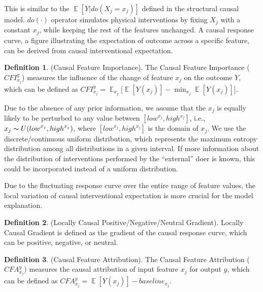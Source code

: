 \documentclass[letterpaper]{article} %
\DeclareMathOperator{\E}{\mathbb{E}}
\theoremstyle{definition}
\newtheorem{definition}{Definition}
\theoremstyle{remark}
\begin{document}
This is similar to the $\E[Y|do(X_j=x_j)]$ defined in the structural causal model. $do(\cdot)$ operator simulates physical interventions by fixing $X_j$ with a constant $x_j$, while keeping the rest of the features unchanged. A causal response curve, a figure illustrating the expectation of outcome across a specific feature, can be derived from causal interventional expectation.



\theoremstyle{definition}
\begin{definition}({Causal Feature Importance}).
The Causal Feature Importance ($CFI^y_{x_j}$) measures the influence of the change of feature $x_j$ on the outcome $Y$, which can be defined as $CFI^y_{x_j} = \E_{x_j} \Bigr[ \E [Y(x_j)] - \min_{x_j} \E[Y(x_j)] \Bigr] $.
\label{def: causal importance}
\end{definition}

Due to the absence of any prior information, we assume that the $x_j$ is equally likely to be perturbed to any value between $[{low}^{x_j}, {high}^{x_j}]$, i.e., $x_j \thicksim U({low}^{x_j}, {high}^{x_j})$, where $[{low}^{x_j}, {high}^{x_j}]$ is the domain of $x_j $. We use the discrete/continuous uniform distribution, which represents the maximum entropy distribution among all distributions in a given interval. If more information about the distribution of interventions performed by the “external” doer is known, this could be incorporated instead of a uniform distribution.

Due to the fluctuating response curve over the entire range of feature values, the local variation of causal interventional expectation is more crucial for the model explanation. 

\theoremstyle{definition}
\begin{definition}({Locally Causal Positive/Negative/Neutral Gradient}). Locally Causal Gradient is defined as the gradient of the causal response curve, which can be positive, negative, or neutral. 
\label{def: causal attribution}
\end{definition}

\theoremstyle{definition}
\begin{definition}({Causal Feature Attribution}).
The Causal Feature Attribution ($CFA^y_{x_j}$) measures the causal attribution of input feature $x_j$ for output $y$, which can be defined as $ CFA^y_{x_j} =  \E [Y(x_j)] - {baseline}_{x_j}  $.
\label{def: causal attribution}
\end{definition}
\end{document}
